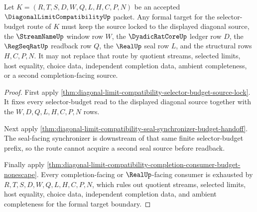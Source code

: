 \begin{theorem}
\label{thm:diagonal-limit-selector-budget-formal-target-lock}
Let $K=(R,T,S,D,W,Q,L,H,C,P,N)$ be an accepted $\DiagonalLimitCompatibilityUp$ packet. Any formal target for the selector-budget route of $K$ must keep the source locked to the displayed diagonal source, the $\StreamNameUp$ window row $W$, the $\DyadicRatCoreUp$ ledger row $D$, the $\RegSeqRatUp$ readback row $Q$, the $\RealUp$ seal row $L$, and the structural rows $H,C,P,N$. It may not replace that route by quotient streams, selected limits, host equality, choice data, independent completion data, ambient completeness, or a second completion-facing source.
\end{theorem}
\begin{proof}
First apply \autoref{thm:diagonal-limit-compatibility-selector-budget-source-lock}. It fixes every selector-budget read to the displayed diagonal source together with the $W,D,Q,L,H,C,P,N$ rows.

Next apply \autoref{thm:diagonal-limit-compatibility-seal-synchronizer-budget-handoff}. The seal-facing synchronizer is downstream of that same finite selector-budget prefix, so the route cannot acquire a second seal source before readback.

Finally apply \autoref{thm:diagonal-limit-compatibility-completion-consumer-budget-nonescape}. Every completion-facing or $\RealUp$-facing consumer is exhausted by $R,T,S,D,W,Q,L,H,C,P,N$, which rules out quotient streams, selected limits, host equality, choice data, independent completion data, and ambient completeness for the formal target boundary.
\end{proof}

